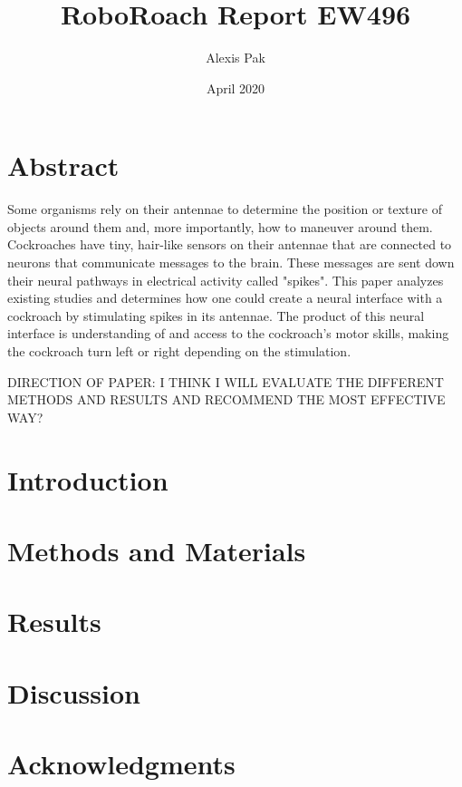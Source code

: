 \documentclass{article}
\title{RoboRoach Report EW496}
\author{Alexis Pak}
\date{April 2020}
\begin{document}
\maketitle

\section{Abstract}

Some organisms rely on their antennae to determine the position or texture of objects around them and, more importantly, how to maneuver around them. Cockroaches have tiny, hair-like sensors on their antennae that are connected to neurons that communicate messages to the brain. These messages are sent down their neural pathways in electrical activity called "spikes". This paper analyzes existing studies and determines how one could create a neural interface with a cockroach by stimulating spikes in its antennae. The product of this neural interface is understanding of and access to the cockroach's motor skills, making the cockroach turn left or right depending on the stimulation. 

\bigskip

DIRECTION OF PAPER: I THINK I WILL EVALUATE THE DIFFERENT METHODS AND RESULTS AND RECOMMEND THE MOST EFFECTIVE WAY?


\section{Introduction}



\section{Methods and Materials}



\section{Results}



\section{Discussion}



\section{Acknowledgments}
\end{document}
